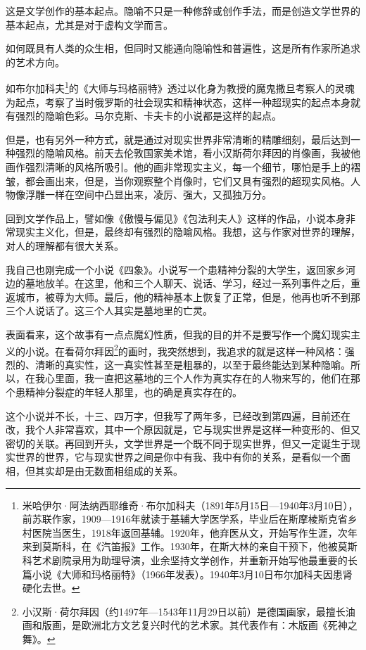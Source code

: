 \documentclass[12pt,a5paper]{ctexbook}
\begin{document}
这是文学创作的基本起点。隐喻不只是一种修辞或创作手法，而是创造文学世界的基本起点，尤其是对于虚构文学而言。

如何既具有人类的众生相，但同时又能通向隐喻性和普遍性，这是所有作家所追求的艺术方向。

如布尔加科夫\footnote{米哈伊尔·阿法纳西耶维奇·布尔加科夫（1891年5月15日—1940年3月10日），前苏联作家，1909—1916年就读于基辅大学医学系，毕业后在斯摩棱斯克省乡村医院当医生，1918年返回基辅。1920年，他弃医从文，开始写作生涯，次年来到莫斯科，在《汽笛报》工作。1930年，在斯大林的亲自干预下，他被莫斯科艺术剧院录用为助理导演，业余坚持文学创作，并重新开始写他最重要的长篇小说《大师和玛格丽特》（1966年发表）。1940年3月10日布尔加科夫因患肾硬化去世。}的《大师与玛格丽特》透过以化身为教授的魔鬼撒旦考察人的灵魂为起点，考察了当时俄罗斯的社会现实和精神状态，这样一种超现实的起点本身就有强烈的隐喻色彩。马尔克斯、卡夫卡的小说都是这样的起点。

但是，也有另外一种方式，就是通过对现实世界非常清晰的精雕细刻，最后达到一种强烈的隐喻风格。前天去伦敦国家美术馆，看小汉斯荷尔拜因的肖像画，我被他画作强烈清晰的风格所吸引。他的画非常现实主义，每一个细节，哪怕是手上的褶皱，都会画出来，但是，当你观察整个肖像时，它们又具有强烈的超现实风格。人物像浮雕一样在空间中凸显出来，凌厉、强大，又孤独万分。

回到文学作品上，譬如像《傲慢与偏见》《包法利夫人》这样的作品，小说本身非常现实主义化，但是，最终却有强烈的隐喻风格。我想，这与作家对世界的理解，对人的理解都有很大关系。

我自己也刚完成一个小说《四象》。小说写一个患精神分裂的大学生，返回家乡河边的墓地放羊。在这里，他和三个人聊天、说话、学习，经过一系列事件之后，重返城市，被尊为大师。最后，他的精神基本上恢复了正常，但是，他再也听不到那三个人说话了。这三个人其实是墓地里的亡灵。

表面看来，这个故事有一点点魔幻性质，但我的目的并不是要写作一个魔幻现实主义的小说。在看荷尔拜因\footnote{小汉斯·荷尔拜因（约1497年—1543年11月29日以前）是德国画家，最擅长油画和版画，是欧洲北方文艺复兴时代的艺术家。其代表作有：木版画《死神之舞》。}的画时，我突然想到，我追求的就是这样一种风格：强烈的、清晰的真实性，这一真实性甚至是粗暴的，以至于最终能达到某种隐喻。所以，在我心里面，我一直把这墓地的三个人作为真实存在的人物来写的，他们在那个患精神分裂症的年轻人那里，也的确是真实存在的。

这个小说并不长，十三、四万字，但我写了两年多，已经改到第四遍，目前还在改，我个人非常喜欢，其中一个原因就是，它与现实世界是这样一种变形的、但又密切的关联。再回到开头，文学世界是一个既不同于现实世界，但又一定诞生于现实世界的世界，它与现实世界之间是你中有我、我中有你的关系，是看似一个面相，但其实却是由无数面相组成的关系。
\end{document}
